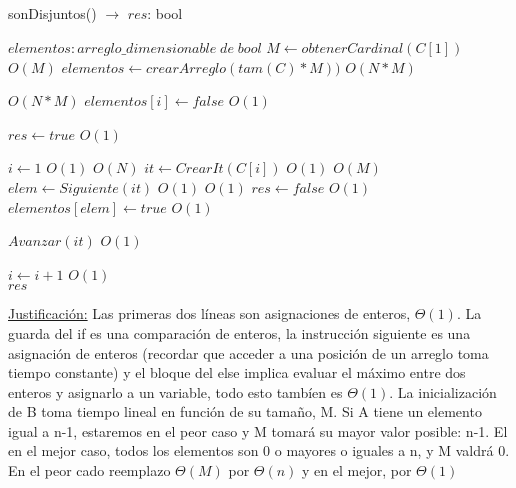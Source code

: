 \documentclass[10pt, a4paper]{article}
\begin{document}
\subsection{}

\begin{algorithm}[H]{sonDisjuntos() $\to$ $res$: bool}	
	\begin{algorithmic}[1]
		\State $elementos: arreglo\_dimensionable\; de\; bool$
		\State $M \gets obtenerCardinal(C[1])$			\Comment $O(M)$		
		\State $elementos \gets crearArreglo(tam(C) * M))$	\Comment $O(N*M)$
		
					\Comment $O(N*M)$
			 \State $elementos[i] \gets false$			\Comment $O(1)$
		\EndFor
		
		\State $res \gets true$			\Comment $O(1)$
		
		\State $i \gets 1$	\Comment $O(1)$
					\Comment $O(N)$
			\State $it \gets CrearIt(C[i])$	\Comment $O(1)$
						\Comment $O(M)$
				\State $elem \gets Siguiente(it)$			\Comment $O(1)$	
				 			\Comment $O(1)$	
					\State $res \gets false$	\Comment $O(1)$
				\Else
					\State $elementos[elem] \gets true$	\Comment $O(1)$
				\EndIf

				\State $Avanzar(it)$			\Comment $O(1)$		 	
			\EndWhile

			\State $i\gets i+1$			\Comment $O(1)$		 	
		\EndWhile \\
		
		\Return $res$
	
		\medskip
		\Statex \underline{Justificación:} Las primeras dos líneas son asignaciones de enteros, $\Theta(1)$. La guarda del if es una comparación de enteros, la instrucción siguiente es una asignación de enteros (recordar que acceder a una posición de un arreglo toma tiempo constante) y el bloque del else implica evaluar el máximo entre dos enteros y asignarlo a un variable, todo esto tambíen es $\Theta(1)$. La inicialización de B toma tiempo lineal en función de su tamaño, M.
		Si A tiene un elemento igual a n-1, estaremos en el peor caso y M tomará su mayor valor posible: n-1. El en el mejor caso, todos los elementos son 0 o mayores o iguales a n, y M valdrá 0. En el peor cado reemplazo $\Theta(M)$ por $\Theta(n)$ y en el mejor, por $\Theta(1)$
    \end{algorithmic}
\end{algorithm}	
\end{document}
